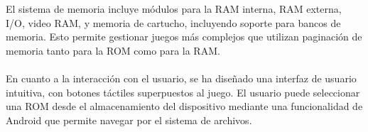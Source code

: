 \\\\
El sistema de memoria incluye módulos para la RAM interna, RAM externa, I/O, video RAM, y memoria de cartucho, incluyendo soporte para bancos de memoria. Esto permite gestionar juegos más complejos que utilizan paginación de memoria tanto para la ROM como para la RAM.
\\\\
En cuanto a la interacción con el usuario, se ha diseñado una interfaz de usuario intuitiva, con botones táctiles superpuestos al juego. El usuario puede seleccionar una ROM desde el almacenamiento del dispositivo mediante una funcionalidad de Android que permite navegar por el sistema de archivos.

\cleardoublepage